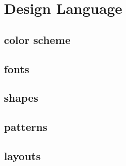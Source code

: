 \section{Design Language}

\subsection{color scheme}


\subsection{fonts}


\subsection{shapes}


\subsection{patterns}


\subsection{layouts}



